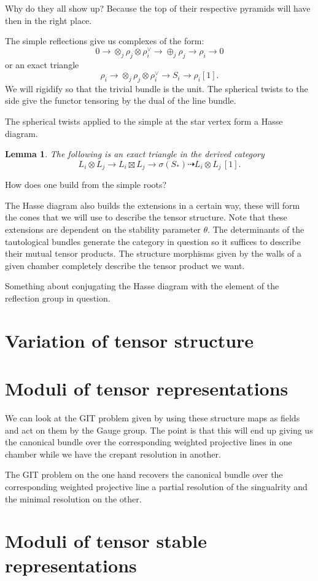 \documentclass{amsart}
\newtheorem{lem}[thm]{Lemma}
\theoremstyle{definition}
\begin{document}
Why do they all show up? Because the top of their respective pyramids will have then in the right place.

The simple reflections give us complexes of the form:
$$ 0 \rightarrow \otimes_{j} \rho_j \otimes \rho_i^\vee \rightarrow \oplus_{j} \rho_j \rightarrow \rho_i \rightarrow 0$$ 
or an exact triangle
$$\rho_i \rightarrow \otimes_{j} \rho_j \otimes \rho_i^\vee \rightarrow S_i \rightarrow \rho_i[1].$$
We will rigidify so that the trivial bundle is the unit. 
The spherical twists to the side give the functor tensoring by the dual of the line bundle.

The spherical twists applied to the simple at the star vertex form a Hasse diagram.

\begin{lem}
The following is an exact triangle in the derived category
$$L_i \otimes L_j \rightarrow L_i \boxtimes L_j \rightarrow \sigma(S_*) \dashrightarrow L_i \otimes L_j\,[1].$$
\end{lem}

How does one build from the simple roots?

The Hasse diagram also builds the extensions in a certain way, these will form the cones that we will use to describe the tensor structure.
Note that these extensions are dependent on the stability parameter $\theta$.
The determinants of the tautological bundles generate the category in question so it suffices to describe their mutual tensor products.
The structure morphisms given by the walls of a given chamber completely describe the tensor product we want.

Something about conjugating the Hasse diagram with the element of the reflection group in question.

\section{Variation of tensor structure}

\section{Moduli of tensor representations}

We can look at the GIT problem given by using these structure maps as fields and act on them by the Gauge group.
The point is that this will end up giving us the canonical bundle over the corresponding weighted projective lines in one chamber while we have the crepant resolution in another.

The GIT problem on the one hand recovers the canonical bundle over the corresponding weighted projective line a partial resolution of the singualrity and the minimal resolution on the other.

\section{Moduli of tensor stable representations}
\end{document}
